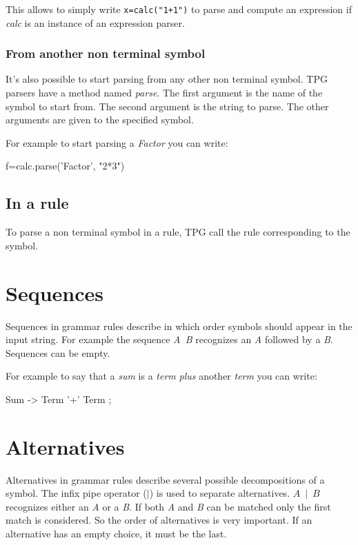 This allows to simply write \verb!x=calc("1+1")! to parse and compute an expression if \emph{calc} is an instance of an expression parser.

\subsubsection{From another non terminal symbol}

It's also possible to start parsing from any other non terminal symbol.
TPG parsers have a method named \emph{parse}.
The first argument is the name of the symbol to start from.
The second argument is the string to parse.
The other arguments are given to the specified symbol.

For example to start parsing a \emph{Factor}
you can write:
\begin{verbatimtab}[4]
	f=calc.parse('Factor', "2*3")
\end{verbatimtab}

\subsection{In a rule}

To parse a non terminal symbol in a rule, TPG call the rule corresponding to the symbol.

\section{Sequences}												\label{parser:sequences}

Sequences in grammar rules describe in which order symbols should appear in the input string.
For example the sequence \emph{A~B} recognizes an \emph{A} followed by a \emph{B}.
Sequences can be empty.

For example to say that a \emph{sum} is a \emph{term} \emph{plus} another \emph{term} you can write:
\begin{verbatimtab}[4]
	Sum -> Term '+' Term ;
\end{verbatimtab}

\section{Alternatives}											\label{parser:alternatives}

Alternatives in grammar rules describe several possible decompositions of a symbol.
The infix pipe operator (\emph{$\mid$}) is used to separate alternatives.
\emph{$A~\mid~B$} recognizes either an \emph{A} or a \emph{B}.
If both \emph{A} and \emph{B} can be matched only the first match is considered.
So the order of alternatives is very important.
If an alternative has an empty choice, it must be the last.

